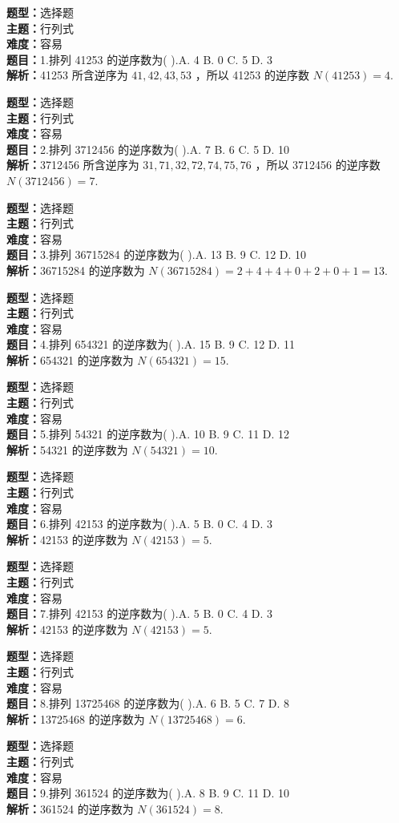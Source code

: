 \documentclass{ctexart}
\newenvironment{question}[5]{%
	\noindent\textbf{题型：}#1\\
	\textbf{主题：}#2\\
	\textbf{难度：}#3\\
	\textbf{题目：}#4\\
	\textbf{解析：}#5\\
	\vspace{1em}
}{}
\begin{document}
	
	\begin{question}
		{选择题}
		{行列式}
		{容易}
		{1.排列 41253 的逆序数为(  ).A. 4 B. 0 C. 5 D. 3}
		{41253 所含逆序为 $41,42,43,53$ ，所以 41253 的逆序数 $N(41253)=4$.}
	\end{question}
	
	\begin{question}
		{选择题}
		{行列式}
		{容易}
		{2.排列 3712456 的逆序数为(  ).A. 7 B. 6 C. 5 D. 10}
		{3712456 所含逆序为 $31,71,32,72,74,75,76$ ，所以 3712456 的逆序数 $N(3712456)=7$.}
	\end{question}
	
	\begin{question}
		{选择题}
		{行列式}
		{容易}
		{3.排列 36715284 的逆序数为(  ).A. 13 B. 9 C. 12 D. 10}
		{36715284 的逆序数为 $N(36715284)=2+4+4+0+2+0+1=13$.}
	\end{question}
	
	\begin{question}
		{选择题}
		{行列式}
		{容易}
		{4.排列 654321 的逆序数为(  ).A. 15 B. 9 C. 12 D. 11}
		{654321 的逆序数为 $N(654321)=15$.}
	\end{question}
	
	\begin{question}
		{选择题}
		{行列式}
		{容易}
		{5.排列 54321 的逆序数为(  ).A. 10 B. 9 C. 11 D. 12}
		{54321 的逆序数为 $N(54321)=10$.}
	\end{question}
	
	\begin{question}
		{选择题}
		{行列式}
		{容易}
		{6.排列 42153 的逆序数为(  ).A. 5 B. 0 C. 4 D. 3}
		{42153 的逆序数为 $N(42153)=5$.}
	\end{question}
	
	\begin{question}
		{选择题}
		{行列式}
		{容易}
		{7.排列 42153 的逆序数为(  ).A. 5 B. 0 C. 4 D. 3}
		{42153 的逆序数为 $N(42153)=5$.}
	\end{question}
	
	\begin{question}
		{选择题}
		{行列式}
		{容易}
		{8.排列 13725468 的逆序数为(  ).A. 6 B. 5 C. 7 D. 8}
		{13725468 的逆序数为 $N(13725468)=6$.}
	\end{question}
	
	\begin{question}
		{选择题}
		{行列式}
		{容易}
		{9.排列 361524 的逆序数为(  ).A. 8 B. 9 C. 11 D. 10}
		{361524 的逆序数为 $N(361524)=8$.}
	\end{question}
	
\end{document}
